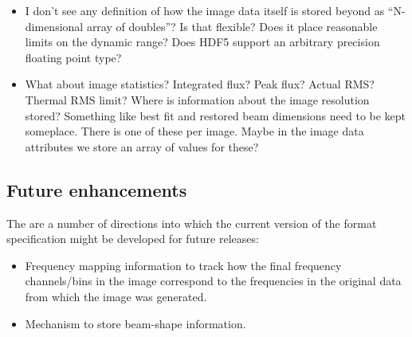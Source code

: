 \documentclass[a4paper,10pt,bibtotoc]{scrartcl}
\begin{document}
\begin{itemize}
  \item{I don't see any definition of how the image data itself is stored
  beyond as ``N-dimensional array of doubles''? Is that flexible? Does it
  place reasonable limits on the dynamic range? Does HDF5 support an arbitrary
  precision floating point type?}

  \item{What about image statistics? Integrated flux? Peak flux?  Actual RMS?
  Thermal RMS limit? Where is information about the image resolution stored?
  Something like best fit and restored beam dimensions need to be kept
  someplace. There is one of these per image. Maybe in the image data
  attributes we store an array of values for these?}

\end{itemize}

\subsection{Future enhancements}
\label{sec:future-enhancements}

The are a number of directions into which the current version of the
format specification might be developed for future releases:

\begin{itemize}

  \item{Frequency mapping information to track how the final frequency
  channels/bins in the image correspond to the frequencies in the
  original data from which the image was generated.}

  \item{Mechanism to store beam-shape information.}

\end{itemize}


\section*{\glossaryname}
\label{sec:glossary}






\end{document}
